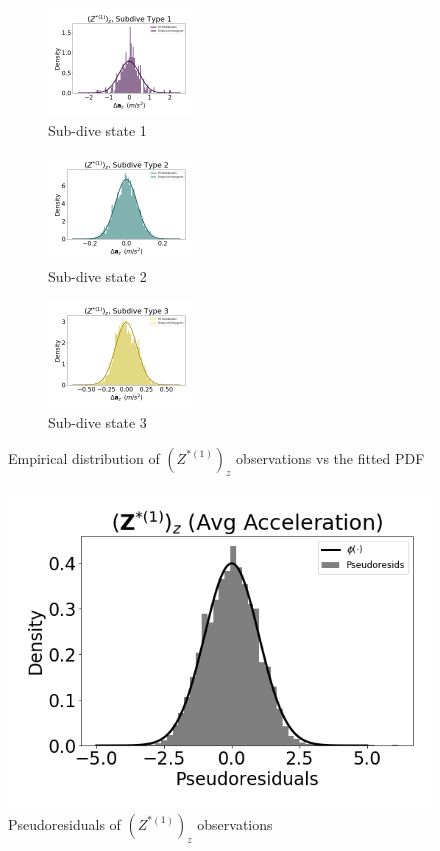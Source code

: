 \documentclass[12pt]{TD-CJS}
\begin{document}

\begin{figure}[ht]
	\centering
	\begin{subfigure}[t]{0.3\textwidth}
        \centering
        \includegraphics[width=1.5in]{../Plots/empirical_hist_Az_0.png}
        \caption{Sub-dive state 1}
    \end{subfigure}
    \begin{subfigure}[t]{0.3\textwidth}
        \centering
        \includegraphics[width=1.5in]{../Plots/empirical_hist_Az_1.png}
        \caption{Sub-dive state 2}
    \end{subfigure}
    \begin{subfigure}[t]{0.3\textwidth}
        \centering
        \includegraphics[width=1.5in]{../Plots/empirical_hist_Az_2.png}
        \caption{Sub-dive state 3}
    \end{subfigure}
    \caption{Empirical distribution of $\left(Z^{*(1)}\right)_z$ observations vs the fitted PDF}
\end{figure}

\begin{figure}
    \centering
    \includegraphics[width=5in]{../Plots/psedoresids_Az.png}
    \caption{Pseudoresiduals of $\left(Z^{*(1)}\right)_z$ observations}
\end{figure}
\end{document}
